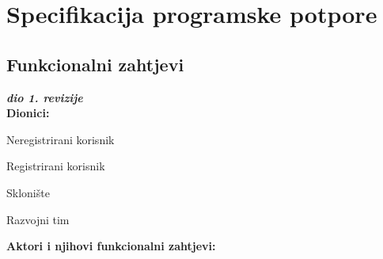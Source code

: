 \chapter{Specifikacija programske potpore}
		
	\section{Funkcionalni zahtjevi}
			
			\textbf{\textit{dio 1. revizije}}\\
			
			\noindent \textbf{Dionici:}
			
			\begin{packed_enum}
				
				\item Neregistrirani korisnik
				\item Registrirani korisnik
				\begin{packed_item}
					\item[a)] Sklonište
				\end{packed_item}
				\item Razvojni tim
				
			\end{packed_enum}
			
			\noindent \textbf{Aktori i njihovi funkcionalni zahtjevi:}
			
